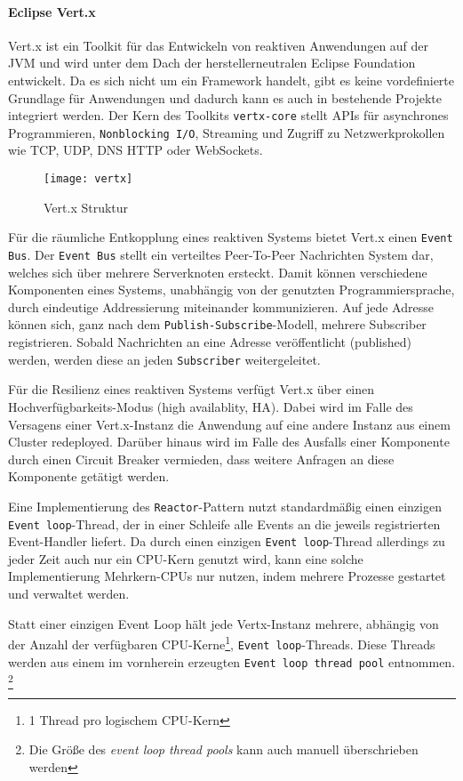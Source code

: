 \paragraph{Eclipse Vert.x}
Vert.x ist ein Toolkit für das Entwickeln von reaktiven Anwendungen auf der JVM und wird unter dem Dach der herstellerneutralen Eclipse Foundation entwickelt.
Da es sich nicht um ein Framework handelt, gibt es keine vordefinierte Grundlage für Anwendungen und dadurch kann es auch in bestehende Projekte
integriert werden.
Der Kern des Toolkits \verb|vertx-core| stellt APIs für asynchrones Programmieren, \verb|Nonblocking I/O|, Streaming und Zugriff zu
Netzwerkprokollen wie TCP, UDP, DNS HTTP oder WebSockets.
\begin{figure}[ht!]
	\centering
	\texttt{[image: vertx]}
	\caption{Vert.x Struktur \parencite{Ponge2020}}
	\label{fig:vertx}
\end{figure}

Für die räumliche Entkopplung eines reaktiven Systems bietet Vert.x einen \verb|Event Bus|.
Der \verb|Event Bus| stellt ein verteiltes Peer-To-Peer Nachrichten System dar, welches sich über mehrere Serverknoten ersteckt.
Damit können verschiedene Komponenten eines Systems, unabhängig von der genutzten Programmiersprache, durch eindeutige Addressierung miteinander kommunizieren.
Auf jede Adresse können sich, ganz nach dem \verb|Publish-Subscribe|-Modell, mehrere Subscriber registrieren. Sobald Nachrichten an eine
Adresse veröffentlicht (published) werden, werden diese an jeden \verb|Subscriber| weitergeleitet.

Für die Resilienz eines reaktiven Systems verfügt Vert.x über einen Hochverfügbarkeits-Modus (high availablity, HA).
Dabei wird im Falle des Versagens einer Vert.x-Instanz die Anwendung auf eine andere Instanz aus einem Cluster redeployed.
Darüber hinaus wird im Falle des Ausfalls einer Komponente durch einen Circuit Breaker vermieden, dass weitere Anfragen an diese
Komponente getätigt werden.\newline

Eine Implementierung des \verb|Reactor|-Pattern nutzt standardmäßig einen einzigen \verb|Event loop|-Thread, der in einer Schleife alle
Events an die jeweils registrierten Event-Handler liefert.
Da durch einen einzigen \verb|Event loop|-Thread allerdings zu jeder Zeit auch nur ein CPU-Kern genutzt wird, kann
eine solche Implementierung Mehrkern-CPUs nur nutzen, indem mehrere Prozesse gestartet und verwaltet werden.

Statt einer einzigen Event Loop hält jede Vertx-Instanz mehrere, abhängig von der Anzahl der verfügbaren CPU-Kerne\footnote{1 Thread pro logischem CPU-Kern},
\verb|Event loop|-Threads. Diese Threads werden aus einem im vornherein erzeugten \verb|Event loop thread pool| entnommen.
\footnote{Die Größe des \textit{event loop thread pools} kann auch manuell überschrieben werden}

